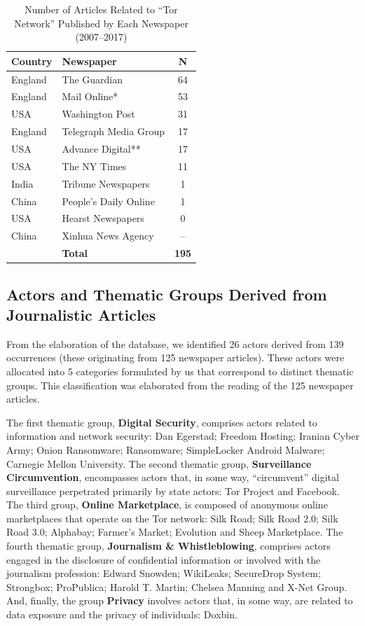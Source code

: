 \begin{table}[H]
\centering
\caption{Number of Articles Related to ``Tor Network'' Published by Each Newspaper (2007--2017)}
\begin{tabular}{llc}
\toprule
\textbf{Country} & \textbf{Newspaper} & \textbf{N} \\
\midrule
England & The Guardian & 64 \\
England & Mail Online* & 53 \\
USA & Washington Post & 31 \\
England & Telegraph Media Group & 17 \\
USA & Advance Digital** & 17 \\
USA & The NY Times & 11 \\
India & Tribune Newspapers & 1 \\
China & People's Daily Online & 1 \\
USA & Hearst Newspapers & 0 \\
China & Xinhua News Agency & -- \\
\midrule
 & \textbf{Total} & \textbf{195} \\
\bottomrule
\end{tabular}
\end{table}

\subsection{Actors and Thematic Groups Derived from Journalistic Articles}

From the elaboration of the database, we identified 26 actors derived from 139 occurrences (these originating from 125 newspaper articles). These actors were allocated into 5 categories formulated by us that correspond to distinct thematic groups. This classification was elaborated from the reading of the 125 newspaper articles.

The first thematic group, \textbf{Digital Security}, comprises actors related to information and network security: Dan Egerstad; Freedom Hosting; Iranian Cyber Army; Onion Ransomware; Ransomware; SimpleLocker Android Malware; Carnegie Mellon University. The second thematic group, \textbf{Surveillance Circumvention}, encompasses actors that, in some way, ``circumvent'' digital surveillance perpetrated primarily by state actors: Tor Project and Facebook. The third group, \textbf{Online Marketplace}, is composed of anonymous online marketplaces that operate on the Tor network: Silk Road; Silk Road 2.0; Silk Road 3.0; Alphabay; Farmer's Market; Evolution and Sheep Marketplace. The fourth thematic group, \textbf{Journalism \& Whistleblowing}, comprises actors engaged in the disclosure of confidential information or involved with the journalism profession: Edward Snowden; WikiLeaks; SecureDrop System; Strongbox; ProPublica; Harold T. Martin; Chelsea Manning and X-Net Group. And, finally, the group \textbf{Privacy} involves actors that, in some way, are related to data exposure and the privacy of individuals: Doxbin.

